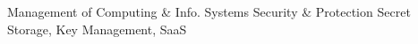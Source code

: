 \documentclass[10pt]{socc}
\begin{document}
         {Management of Computing \& Info. Systems}
         {Security \& Protection}
\keywords
Secret Storage, Key Management, SaaS








{
  
  \softraggedright
  
}
\end{document}

